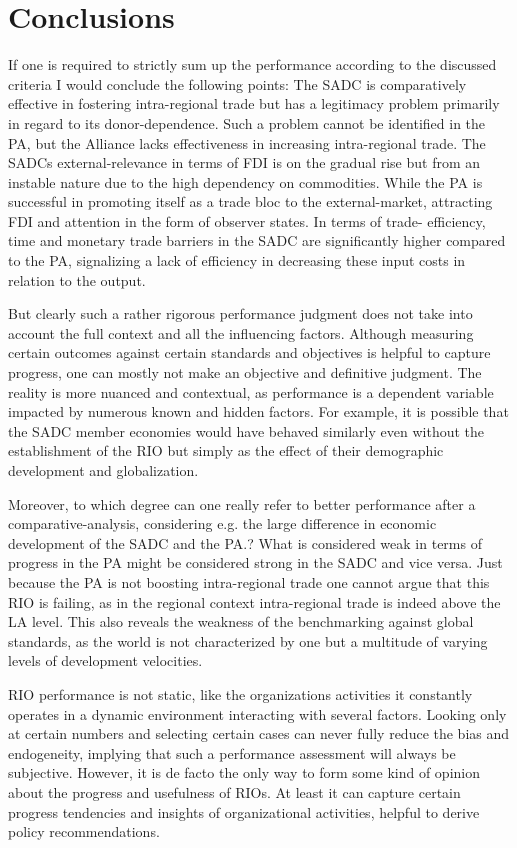\section{Conclusions}

If one is required to strictly sum up the performance according to the discussed criteria I would conclude the following points: The SADC is comparatively effective in fostering intra-regional trade but has a legitimacy problem primarily in regard to its donor-dependence. Such a problem cannot be identified in the PA, but the Alliance lacks effectiveness in increasing intra-regional trade. The SADCs external-relevance in terms of FDI is on the gradual rise but from an instable nature due to the high dependency on commodities. While the PA is successful in promoting itself as a trade bloc to the external-market, attracting FDI and attention in the form of observer states. In terms of trade- efficiency, time and monetary trade barriers in the SADC are significantly higher compared to the PA, signalizing a lack of efficiency in decreasing these input costs in relation to the output.

But clearly such a rather rigorous performance judgment does not take into account the full context and all the influencing factors. Although measuring certain outcomes against certain standards and objectives is helpful to capture progress, one can mostly not make an objective and definitive judgment. The reality is more nuanced and contextual, as performance is a dependent variable impacted by numerous known and hidden factors. For example, it is possible that the SADC member economies would have behaved similarly even without the establishment of the RIO but simply as the effect of their demographic development and globalization. 

Moreover, to which degree can one really refer to better performance after a comparative-analysis, considering e.g. the large difference in economic development of the SADC and the PA.? What is considered weak in terms of progress in the PA might be considered strong in the SADC and vice versa. Just because the PA is not boosting intra-regional trade one cannot argue that this RIO is failing, as in the regional context intra-regional trade is indeed above the LA level. This also reveals the weakness of the benchmarking against global standards, as the world is not characterized by one but a multitude of varying levels of development velocities.

RIO performance is not static, like the organizations activities it constantly operates in a dynamic environment interacting with several factors. Looking only at certain numbers and selecting certain cases can never fully reduce the bias and endogeneity, implying that such a performance assessment will always be subjective. However, it is de facto the only way to form some kind of opinion about the progress and usefulness of RIOs. At least it can capture certain progress tendencies and insights of organizational activities, helpful to derive policy recommendations.



\copyrightnotice
